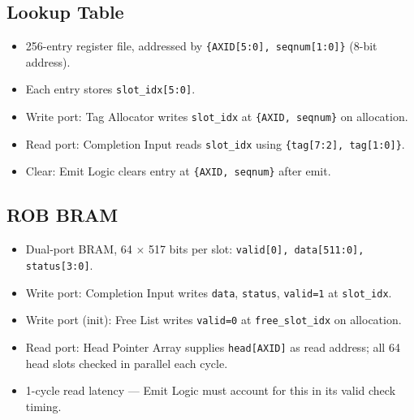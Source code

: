 \documentclass[11pt]{article}
\begin{document}
\subsection{Lookup Table}
\begin{itemize}[noitemsep]
  \item 256-entry register file, addressed by \texttt{\{AXID[5:0], seqnum[1:0]\}} (8-bit address).
  \item Each entry stores \texttt{slot\_idx[5:0]}.
  \item Write port: Tag Allocator writes \texttt{slot\_idx} at \texttt{\{AXID, seqnum\}} on allocation.
  \item Read port: Completion Input reads \texttt{slot\_idx} using \texttt{\{tag[7:2], tag[1:0]\}}.
  \item Clear: Emit Logic clears entry at \texttt{\{AXID, seqnum\}} after emit.
\end{itemize}

\subsection{ROB BRAM}
\begin{itemize}[noitemsep]
  \item Dual-port BRAM, 64 $\times$ 517 bits per slot: \texttt{valid[0], data[511:0], status[3:0]}.
  \item Write port: Completion Input writes \texttt{data}, \texttt{status}, \texttt{valid=1} at \texttt{slot\_idx}.
  \item Write port (init): Free List writes \texttt{valid=0} at \texttt{free\_slot\_idx} on allocation.
  \item Read port: Head Pointer Array supplies \texttt{head[AXID]} as read address; all 64 head slots checked in parallel each cycle.
  \item 1-cycle read latency — Emit Logic must account for this in its valid check timing.
\end{itemize}
\end{document}
